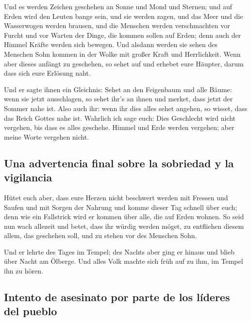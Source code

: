  Und es werden Zeichen geschehen an Sonne und Mond und
Sternen; und auf Erden wird den Leuten bange sein, und sie werden zagen,
und das Meer und die Wasserwogen werden brausen,  und die
Menschen werden verschmachten vor Furcht und vor Warten der Dinge, die
kommen sollen auf Erden; denn auch der Himmel Kräfte werden sich
bewegen.  Und alsdann werden sie sehen des Menschen Sohn
kommen in der Wolke mit großer Kraft und Herrlichkeit. 
Wenn aber dieses anfängt zu geschehen, so sehet auf und erhebet eure
Häupter, darum dass sich eure Erlösung naht.

 Und er sagte ihnen ein Gleichnis: Sehet an den
Feigenbaum und alle Bäume:  wenn sie jetzt ausschlagen,
so sehet ihr's an ihnen und merket, dass jetzt der Sommer nahe ist.
 Also auch ihr: wenn ihr dies alles sehet angehen, so
wisset, dass das Reich Gottes nahe ist.  Wahrlich ich
sage euch: Dies Geschlecht wird nicht vergehen, bis dass es alles
geschehe.  Himmel und Erde werden vergehen; aber meine
Worte vergehen nicht.

\hypertarget{una-advertencia-final-sobre-la-sobriedad-y-la-vigilancia}{%
\subsection{Una advertencia final sobre la sobriedad y la
vigilancia}\label{una-advertencia-final-sobre-la-sobriedad-y-la-vigilancia}}

 Hütet euch aber, dass eure Herzen nicht beschwert werden
mit Fressen und Saufen und mit Sorgen der Nahrung und komme dieser Tag
schnell über euch;  denn wie ein Fallstrick wird er
kommen über alle, die auf Erden wohnen.  So seid nun wach
allezeit und betet, dass ihr würdig werden möget, zu entfliehen diesem
allem, das geschehen soll, und zu stehen vor des Menschen Sohn.

 Und er lehrte des Tages im Tempel; des Nachts aber ging
er hinaus und blieb über Nacht am Ölberge.  Und alles
Volk machte sich früh auf zu ihm, im Tempel ihn zu hören.

\hypertarget{intento-de-asesinato-por-parte-de-los-luxedderes-del-pueblo}{%
\subsection{Intento de asesinato por parte de los líderes del
pueblo}\label{intento-de-asesinato-por-parte-de-los-luxedderes-del-pueblo}}

